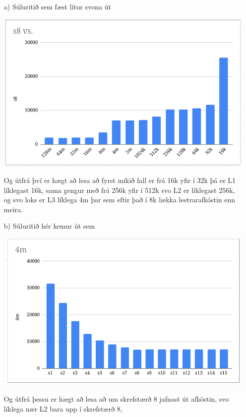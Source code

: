 \documentclass{article}
\begin{document}
	\section{}
	\begin{itemize}
		\item[a)] Súluritið sem fæst lítur svona út
			\begin{center}
				\includegraphics[scale=0.35]{s8.png}
			\end{center}
			Og útfrá því er hægt að lesa að fyrst mikið fall er frá 16k yfir 
			í 32k þá er L1 líklegast 16k, sama gengur með frá 256k yfir 
			í 512k svo L2 er líklegast 256k, og svo loks er L3 líklega 
			4m þar sem eftir það í 8k lækka lestrarafköstin enn meira.
		\item[b)] Súluritið hér kemur út sem
			\begin{center}
				\includegraphics[scale=0.35]{4m.png}
			\end{center}
			Og útfrá þessu er hægt að lesa að um skrefstærð 8 jafnast 
			út afköstin, svo líklega nær L2 bara upp í skrefstærð $8$, 

\end{itemize}
\end{document}
